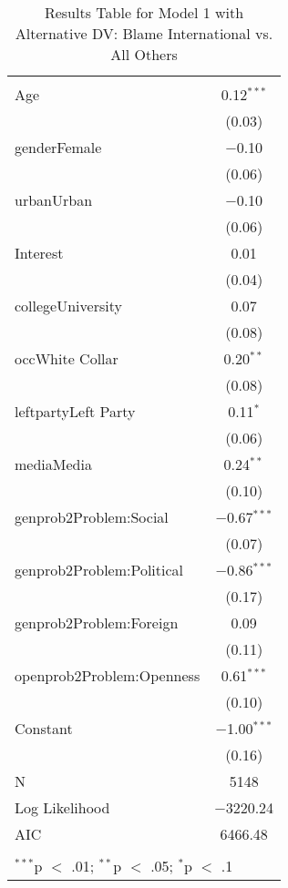 
\begin{table}[!htbp] \centering 
  \caption{Results Table for Model 1 with Alternative DV: Blame International vs. All Others} 
  \label{} 
\footnotesize 
\begin{tabular}{@{\extracolsep{5pt}}lc} 
\\[-1.8ex]\hline \\[-1.8ex] 
\hline \\[-1.8ex] 
 Age & 0.12$^{***}$ \\ 
  & (0.03) \\ 
  genderFemale & $-$0.10 \\ 
  & (0.06) \\ 
  urbanUrban & $-$0.10 \\ 
  & (0.06) \\ 
  Interest & 0.01 \\ 
  & (0.04) \\ 
  collegeUniversity & 0.07 \\ 
  & (0.08) \\ 
  occWhite Collar & 0.20$^{**}$ \\ 
  & (0.08) \\ 
  leftpartyLeft Party & 0.11$^{*}$ \\ 
  & (0.06) \\ 
  mediaMedia & 0.24$^{**}$ \\ 
  & (0.10) \\ 
  genprob2Problem:Social & $-$0.67$^{***}$ \\ 
  & (0.07) \\ 
  genprob2Problem:Political & $-$0.86$^{***}$ \\ 
  & (0.17) \\ 
  genprob2Problem:Foreign & 0.09 \\ 
  & (0.11) \\ 
  openprob2Problem:Openness & 0.61$^{***}$ \\ 
  & (0.10) \\ 
  Constant & $-$1.00$^{***}$ \\ 
  & (0.16) \\ 
 N & 5148 \\ 
Log Likelihood & $-$3220.24 \\ 
AIC & 6466.48 \\ 
\hline \\[-1.8ex] 
\multicolumn{2}{l}{$^{***}$p $<$ .01; $^{**}$p $<$ .05; $^{*}$p $<$ .1} \\ 
\end{tabular} 
\end{table} 
